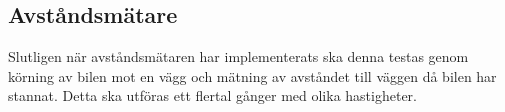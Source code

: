 \documentclass[a4paper]{article}
\begin{document}
\subsection{Avståndsmätare}
Slutligen när avståndsmätaren har implementerats ska denna testas genom körning av bilen mot en vägg och mätning av avståndet till väggen då bilen har stannat. Detta ska utföras ett flertal gånger med olika hastigheter. 

\newpage


\end{document}

